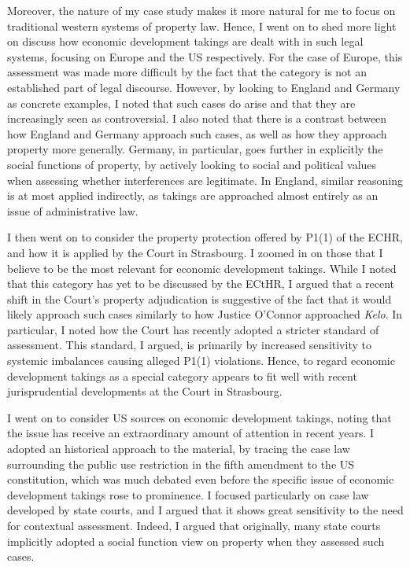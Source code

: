 Moreover, the nature of my case study makes it more natural for me to focus on traditional western systems of property law. Hence, I went on to shed more light on discuss how economic development takings are dealt with in such legal systems, focusing on Europe and the US respectively. For the case of Europe, this assessment was made more difficult by the fact that the category is not an established part of legal discourse. However, by looking to England and Germany as concrete examples, I noted that such cases do arise and that they are increasingly seen as controversial. I also noted that there is a contrast between how England and Germany approach such cases, as well as how they approach property more generally. Germany, in particular, goes further in explicitly  the social functions of property, by actively looking to social and political values when assessing whether interferences are legitimate. In England, similar reasoning is at most applied indirectly, as takings are approached almost entirely as an issue of administrative law. 

I then went on to consider the property protection offered by P1(1) of the ECHR, and how it is applied by the Court in Strasbourg. I zoomed in on those  that I believe to be the most relevant for economic development takings. While I noted that this category has yet to be discussed by the ECtHR, I argued that a recent shift in the Court's property adjudication is suggestive of the fact that it would likely approach such cases similarly to how Justice O'Connor approached {\it Kelo}. In particular, I noted how the Court has recently adopted a stricter standard of assessment. This standard, I argued, is  primarily by increased sensitivity to systemic imbalances causing alleged P1(1) violations. Hence, to regard economic development takings as a special category appears to fit well with recent jurisprudential developments at the Court in Strasbourg.

I went on to consider US sources on economic development takings, noting that the issue has receive an extraordinary amount of attention in recent years. I adopted an historical approach to the material, by tracing the case law surrounding the public use restriction in the fifth amendment to the US constitution, which was much debated even before the specific issue of economic development takings rose to prominence. I focused particularly on case law developed by state courts, and I argued that it shows great sensitivity to the need for contextual assessment. Indeed, I argued that originally, many state courts implicitly adopted a social function view on property when they assessed such cases.

